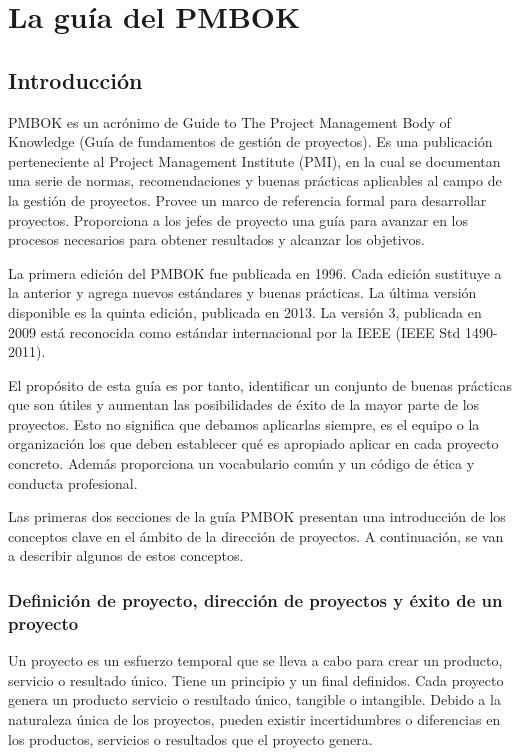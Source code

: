 \newpage{}
\section{La guía del PMBOK}

\subsection{Introducción}

PMBOK es un acrónimo de Guide to The Project Management Body of Knowledge (Guía de fundamentos de gestión de proyectos). Es una publicación perteneciente al Project Management Institute (PMI), en la cual se documentan una serie de normas, recomendaciones y buenas prácticas aplicables al campo de la gestión de proyectos. Provee un marco de referencia formal para desarrollar proyectos. Proporciona a los jefes de proyecto una guía para avanzar en los procesos necesarios para obtener resultados y alcanzar los objetivos. 

La primera edición del PMBOK fue publicada en 1996. Cada edición sustituye a la anterior y agrega nuevos estándares y buenas prácticas. La última versión disponible es la quinta edición, publicada en 2013. La versión 3, publicada en 2009 está reconocida como estándar internacional por la IEEE (IEEE Std 1490-2011).

El propósito de esta guía es por tanto, identificar un conjunto de buenas prácticas que son útiles y aumentan las posibilidades de éxito de la mayor parte de los proyectos. Esto no significa que debamos aplicarlas siempre, es el equipo o la organización los que deben establecer qué es apropiado aplicar en cada proyecto concreto. Además proporciona un vocabulario común y un código de ética y conducta profesional.

Las primeras dos secciones de la guía PMBOK presentan una introducción de los conceptos clave en el ámbito de la dirección de proyectos. A continuación, se van a describir algunos de estos conceptos.

\subsubsection{Definición de proyecto, dirección de proyectos y éxito de un proyecto}

Un proyecto es un esfuerzo temporal que se lleva a cabo para crear un producto, servicio o resultado único. Tiene un principio y un final definidos. Cada proyecto genera un producto servicio o resultado único, tangible o intangible. Debido a la naturaleza única de los proyectos, pueden existir incertidumbres o diferencias en los productos, servicios o resultados que el proyecto genera.

